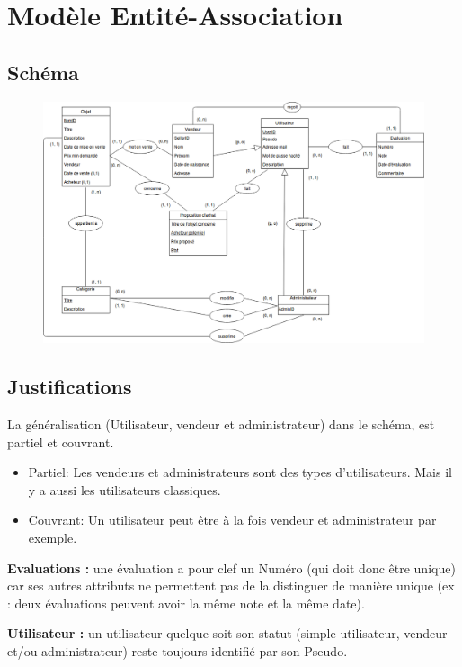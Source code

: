 \documentclass[a4paper,11pt]{article}
\begin{document}
\section{Modèle Entité-Association}
\subsection{Schéma}
\begin{center}
  \begin{figure}
    \includegraphics[width = 25cm]{SchemaEA.png}
  \end{figure}
\end{center}

\newpage

\subsection{Justifications}
La généralisation (Utilisateur, vendeur et administrateur) dans le schéma, est partiel et couvrant.
\begin{itemize}
\item Partiel: Les vendeurs et administrateurs sont des types d'utilisateurs. Mais il y a aussi les utilisateurs classiques.
\item Couvrant: Un utilisateur peut être à la fois vendeur et administrateur par exemple.
\end{itemize}

\textbf{Evaluations :} une évaluation a pour clef un Numéro (qui doit donc être unique) car ses autres attributs ne permettent pas de la
	      distinguer de manière unique (ex : deux évaluations peuvent avoir la même note et la même date).

\textbf{Utilisateur :} un utilisateur quelque soit son statut (simple utilisateur, vendeur et/ou administrateur) reste toujours identifié
par son Pseudo.
\end{document}

